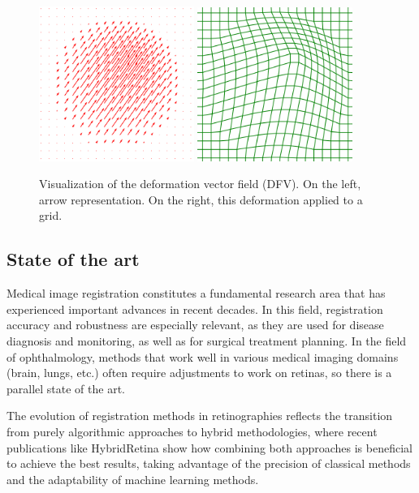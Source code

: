 \begin{figure}[tbp]
    \centering
    \includegraphics[width=0.45\textwidth]{imaxes/dfv_arrows.png}
    \includegraphics[width=0.45\textwidth]{imaxes/dfv_grid.png}
    \caption{Visualization of the deformation vector field (DFV). On the left, arrow representation. On the right, this deformation applied to a grid.}
    \label{fig:dfv_visualization}
\end{figure}

\subsection{State of the art}
\label{subsec:State of the art}

Medical image registration constitutes a fundamental research area that has experienced important advances in recent decades. In this field, registration accuracy and robustness are especially relevant, as they are used for disease diagnosis and monitoring, as well as for surgical treatment planning.
In the field of ophthalmology, methods that work well in various medical imaging domains (brain, lungs, etc.) often require adjustments to work on retinas, so there is a parallel state of the art.

The evolution of registration methods in retinographies reflects the transition from purely algorithmic approaches to hybrid methodologies, where recent publications like HybridRetina \cite{liu2024progressiveretinalimageregistration} show how combining both approaches is beneficial to achieve the best results, taking advantage of the precision of classical methods and the adaptability of machine learning methods.

